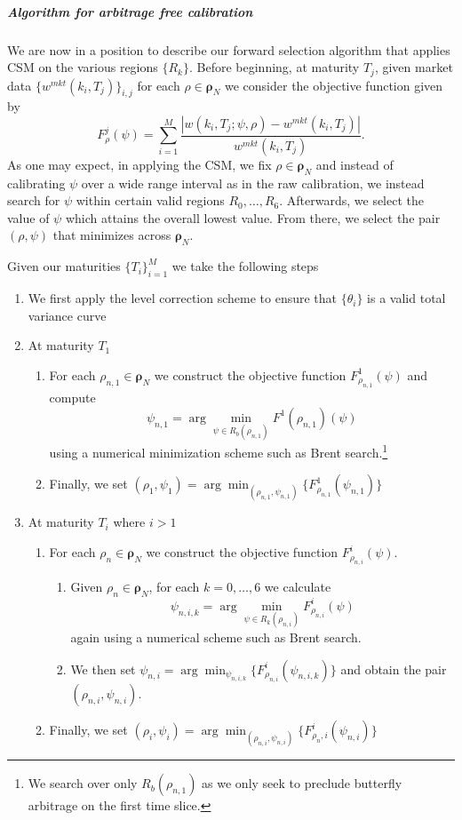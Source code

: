 \documentclass[11pt,letterpaper]{article}
\begin{document}
\subparagraph{Algorithm for arbitrage free calibration} We are now in a position to describe our forward selection algorithm that applies CSM on the various regions $\{R_k\}$. Before beginning, at maturity $T_j$, given market data $\{w^{mkt}(k_i,T_j)\}_{i,j}$ for each $\rho \in \pmb{\rho}_N$ we consider the objective function given by
\[
F^j_{\rho}(\psi) = \sum_{i=1}^M  \frac{  | w(k_i,T_j; \psi, \rho ) - w^{mkt}(k_i,T_j)|  }{ w^{mkt}(k_i,T_j) }.
\]
As one may expect, in applying the CSM, we fix $\rho \in \pmb{\rho}_N$ and instead of calibrating $\psi$ over a wide range interval as in the raw calibration, we instead search for $\psi$ within certain valid regions $R_0,\ldots,R_6$. Afterwards, we select the value of $\psi$ which attains the overall lowest value. From there, we select the pair $(\rho,\psi)$ that minimizes across $\pmb{\rho}_N$. 

 
Given our maturities $\{T_i\}_{i=1}^M$ we take the following steps
\begin{enumerate}
\item We first apply the level correction scheme to ensure that $\{\theta_i\}$ is a valid total variance curve
\item At maturity $T_1$ 
\begin{enumerate}
\item For each $\rho_{n,1} \in \pmb{\rho}_N$ we construct the objective function $ F^1_{\rho_{n,1}}(\psi)$ and compute 
\[
\psi_{n,1} = \arg\min_{\psi \in R_b(\rho_{n,1}) } F^1(\rho_{n,1})(\psi)
\]
using a numerical minimization scheme such as Brent search.\footnote{We search over only $R_b(\rho_{n,1})$ as we only seek to preclude butterfly arbitrage on the first time slice.} 
\item Finally, we set $(\rho_1,\psi_1) = \arg\min_{ (\rho_{n,1},\psi_{n,1} )} \{ F^1_{\rho_{n,1}}(\psi_{n,1})\}$ 
\end{enumerate}
\item At maturity $T_i$ where $i > 1$ 
\begin{enumerate}
\item For each $\rho_n \in \pmb{\rho}_N$ we construct the objective function $F^i_{\rho_{n,i}}(\psi)$. 
\begin{enumerate}
\item Given $\rho_n \in \pmb{\rho}_N$, for each $k = 0,\ldots, 6$ we calculate 
\[
\psi_{n,i,k} = \arg\min_{\psi \in R_k(\rho_{n,i}) } F^i_{\rho_{n,i}}(\psi)
\]
again using a numerical scheme such as Brent search.
\item We then set $\psi_{n,i} = \arg\min_{ \psi_{n,i,k} } \{ F^i_{\rho_{n,i}}(\psi_{n,i,k})\}$ and obtain the pair $(\rho_{n,i},\psi_{n,i})$.
\end{enumerate} 
\item Finally, we set $(\rho_i,\psi_i) = \arg\min_{(\rho_{n,i},\psi_{n,i})} \{ F^{i}_{\rho_n,i}(\psi_{n,i}) \}$
\end{enumerate}

\end{enumerate}
\end{document}

